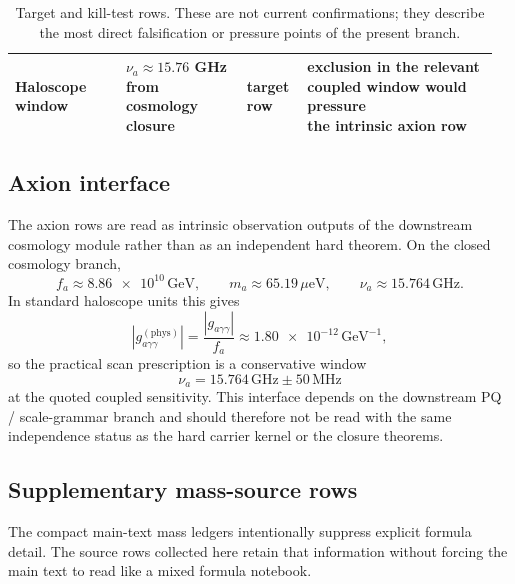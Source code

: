 \documentclass[11pt,a4paper]{article}
\theoremstyle{definition}
\theoremstyle{remark}
\begin{document}
\begin{table}[H]
{\begin{tabular}{@{}>{\raggedright\arraybackslash}p{0.22\linewidth}>{\raggedright\arraybackslash}p{0.24\linewidth}>{\raggedright\arraybackslash}p{0.12\linewidth}>{\raggedright\arraybackslash}p{0.38\linewidth}@{}}
Haloscope window & \makecell[l]{$\nu_a\approx\num{15.76}$ GHz\\from cosmology closure} & \makecell[l]{target\\row} & \makecell[l]{exclusion in the relevant\\coupled window would pressure\\the intrinsic axion row} \\
\bottomrule
\end{tabular}}
\caption{Target and kill-test rows. These are not current confirmations; they describe the most direct falsification or pressure points of the present branch.}
\label{tab:kill-tests}
\end{table}

\subsection{Axion interface}

The axion rows are read as intrinsic observation outputs of the downstream cosmology module
rather than as an independent hard theorem. On the closed cosmology branch,
\[
f_a\approx \num{8.86e10}\,\mathrm{GeV},
\qquad
m_a\approx \num{65.19}\,\mu\mathrm{eV},
\qquad
\nu_a\approx \num{15.764}\,\mathrm{GHz}.
\]
In standard haloscope units this gives
\[
\left|g_{a\gamma\gamma}^{(\mathrm{phys})}\right|
=
\frac{|g_{a\gamma\gamma}|}{f_a}
\approx
\num{1.80e-12}\,\mathrm{GeV}^{-1},
\]
so the practical scan prescription is a conservative window
\[
\nu_a=\num{15.764}\,\mathrm{GHz}\pm \num{50}\,\mathrm{MHz}
\]
at the quoted coupled sensitivity. This interface depends on the downstream PQ / scale-grammar branch and should therefore not be read with the same independence status as the hard carrier kernel or the closure theorems.

\subsection{Supplementary mass-source rows}

The compact main-text mass ledgers intentionally suppress explicit formula detail. The source rows collected here retain that information without forcing the main text to read like a mixed formula notebook.
\end{document}

